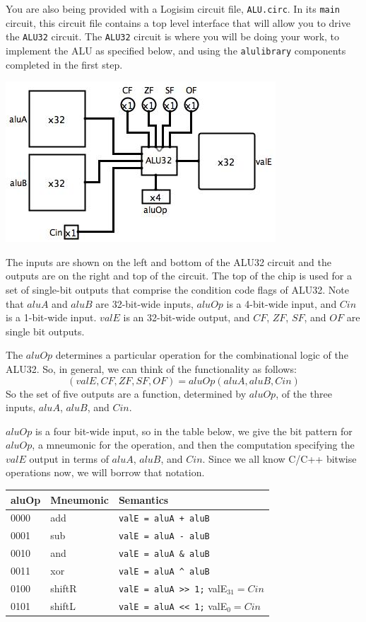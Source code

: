 \documentclass[11pt]{article}
\begin{document}
You are also being provided with a Logisim circuit file, \texttt{ALU.circ}.  In its \texttt{main} circuit, this circuit file contains a top level interface that will allow you to drive the \texttt{ALU32} circuit.  The \texttt{ALU32} circuit is where you will be doing your work, to implement the ALU as specified below, and using the \texttt{alulibrary} components completed in the first step.
\begin{center}
\includegraphics[scale=0.7]{y86_alutop}
\end{center}
The inputs are shown on the left and bottom of the ALU32 circuit and the outputs are on the right and top of the circuit.  The top of the chip is used for a set of single-bit outputs that comprise the condition code flags of ALU32.  Note that $aluA$ and $aluB$ are 32-bit-wide inputs, $aluOp$ is a 4-bit-wide input, and $Cin$ is a 1-bit-wide input.  $valE$ is an 32-bit-wide output, and $CF$, $ZF$, $SF$, and $OF$ are single bit outputs.

The $aluOp$ determines a particular operation for the combinational logic of the ALU32.  So, in general, we can think of the functionality as follows:
\[
(valE, CF, ZF, SF, OF) = aluOp(aluA, aluB, Cin)
\]
So the set of five outputs are a function, determined by $aluOp$, of the three inputs, $aluA$, $aluB$, and $Cin$.

$aluOp$ is a four bit-wide input, so in the table below, we give the bit pattern for $aluOp$, a mneumonic for the operation, and then the computation specifying the $valE$ output in terms of $aluA$, $aluB$, and $Cin$.  Since we all know C/C++ bitwise operations now, we will borrow that notation.
\small
\begin{center}
\begin{tabular}{|l|l|p{3in}|}
\hline
\bf{aluOp} & \bf{Mneumonic} & \bf{Semantics} \\ \hline \hline
0000 & add     &  	\texttt{valE = aluA + aluB}\\ \hline
0001 & sub & 	\verb|valE = aluA - aluB|\\ \hline
0010 & and &	\verb|valE = aluA & aluB|\\ \hline
0011 &xor&	 \verb|valE = aluA ^ aluB|\\ \hline
0100 & shiftR & \verb|valE = aluA >> 1;| valE$_{31} = Cin$ \\ \hline
0101 & shiftL & \verb|valE = aluA << 1;| valE$_0 = Cin$ \\ \hline
\end{tabular}
\end{center}
\normalsize
\end{document}

